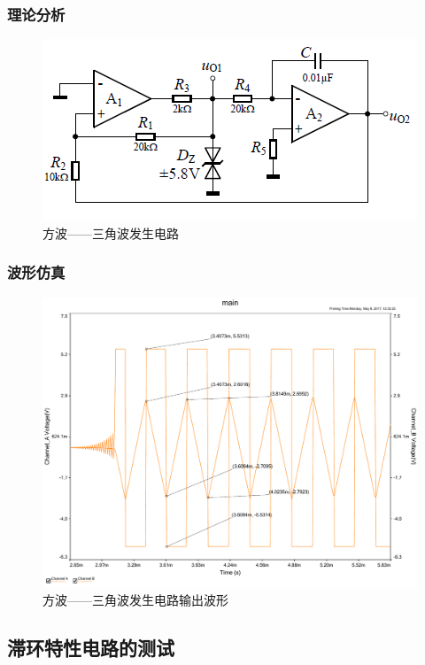 \documentclass[UTF8,a4paper]{paper}
\begin{document}
\subsubsection{理论分析}
\begin{multicols}{2}
\begin {figure}[H]
\includegraphics [width=\columnwidth]{bi.png}
\caption{方波——三角波发生电路}
\label{BICirc}
\end {figure}
\end{multicols}
\subsubsection{波形仿真}
\begin{figure}[H]
\centering
\includegraphics[width=\textwidth]{bi.pdf}
\caption{方波——三角波发生电路输出波形}
\label{BI}
\end{figure}
\subsection{滞环特性电路的测试}
\end{document}
